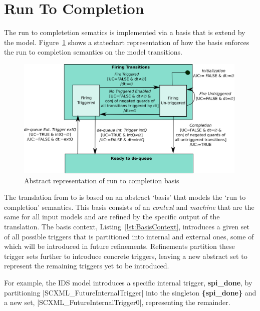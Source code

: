 

\section{Run To Completion}

The run to completetion sematics is implemented via a basis that is extend by the model. 
Figure~\ref{fig:basis} shows a statechart representation of how the basis enforces 
the run to completion semantics on the model transitions.
\begin{figure}[!h]
	\vspace{-.4cm}
	\centering
	\includegraphics[width=0.99\textwidth]{figures/basis.png}
	\caption{Abstract representation of run to completion basis}
	\label{fig:basis}
	\vspace{-.4cm}
\end{figure}

The translation from \SCXML to \EVENTB is based on an abstract `basis' that models the `run to completion' semantics. 
This basis consists of an \EVENTB \emph{context} and \emph{machine} that are the same for all input models and are refined by the specific output of the translation.  
The basis context, Listing~\ref{lst:BasisContext}, introduces a given set of all possible triggers that is partitioned into internal and external ones, some of which will be introduced in future refinements. 
Refinements partition these trigger sets further to introduce concrete triggers, leaving a new abstract set to represent the remaining triggers yet to be introduced. 

For example, the IDS model introduces a specific internal trigger, \textbf{spi\_done},  by partitioning |SCXML_FutureInternalTrigger| into the singleton \textbf{\{spi\_done\}} and a new set, |SCXML_FutureInternalTrigger0|, representing the remainder. 

